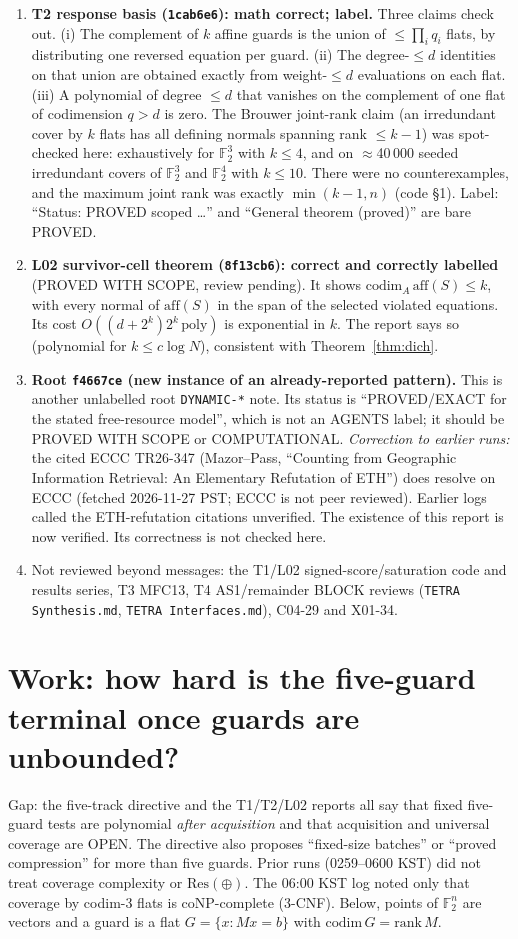 \documentclass[11pt]{article}
\theoremstyle{definition}
\newcommand{\F}{\mathbb{F}_2}
\newcommand{\Resx}{\mathrm{Res}(\oplus)}
\begin{document}
\begin{enumerate}
\item \textbf{T2 response basis (\texttt{1cab6e6}): math correct; label.} Three claims check out. (i) The complement of $k$ affine guards is the union of $\le\prod_i q_i$ flats, by distributing one reversed equation per guard. (ii) The degree-$\le d$ identities on that union are obtained exactly from weight-$\le d$ evaluations on each flat. (iii) A polynomial of degree $\le d$ that vanishes on the complement of one flat of codimension $q>d$ is zero. The Brouwer joint-rank claim (an irredundant cover by $k$ flats has all defining normals spanning rank $\le k-1$) was spot-checked here: exhaustively for $\F^3$ with $k\le 4$, and on $\approx$40\,000 seeded irredundant covers of $\F^3$ and $\F^4$ with $k\le 10$. There were no counterexamples, and the maximum joint rank was exactly $\min(k-1,n)$ (code \S1). Label: ``Status: PROVED scoped \ldots'' and ``General theorem (proved)'' are bare PROVED.
\item \textbf{L02 survivor-cell theorem (\texttt{8f13cb6}): correct and correctly labelled} (PROVED WITH SCOPE, review pending). It shows $\mathrm{codim}_A\,\mathrm{aff}(S)\le k$, with every normal of $\mathrm{aff}(S)$ in the span of the selected violated equations. Its cost $O((d+2^k)2^k\,\mathrm{poly})$ is exponential in $k$. The report says so (polynomial for $k\le c\log N$), consistent with Theorem~\ref{thm:dich}.
\item \textbf{Root \texttt{f4667ce} (new instance of an already-reported pattern).} This is another unlabelled root \texttt{DYNAMIC-*} note. Its status is ``PROVED/EXACT for the stated free-resource model'', which is not an AGENTS label; it should be PROVED WITH SCOPE or COMPUTATIONAL. \emph{Correction to earlier runs:} the cited ECCC TR26-347 (Mazor--Pass, ``Counting from Geographic Information Retrieval: An Elementary Refutation of ETH'') does resolve on ECCC (fetched 2026-11-27 PST; ECCC is not peer reviewed). Earlier logs called the ETH-refutation citations unverified. The existence of this report is now verified. Its correctness is not checked here.
\item Not reviewed beyond messages: the T1/L02 signed-score/saturation code and results series, T3 MFC13, T4 AS1/remainder BLOCK reviews (\texttt{TETRA Synthesis.md}, \texttt{TETRA Interfaces.md}), C04-29 and X01-34.
\end{enumerate}

\section{Work: how hard is the five-guard terminal once guards are unbounded?}
Gap: the five-track directive and the T1/T2/L02 reports all say that fixed five-guard tests are polynomial \emph{after acquisition} and that acquisition and universal coverage are OPEN. The directive also proposes ``fixed-size batches'' or ``proved compression'' for more than five guards. Prior runs (0259--0600 KST) did not treat coverage complexity or $\Resx$. The 06:00 KST log noted only that coverage by codim-3 flats is coNP-complete (3-CNF). Below, points of $\F^n$ are vectors and a guard is a flat $G=\{x: Mx=b\}$ with $\mathrm{codim}\,G=\mathrm{rank}\,M$.
\end{document}
